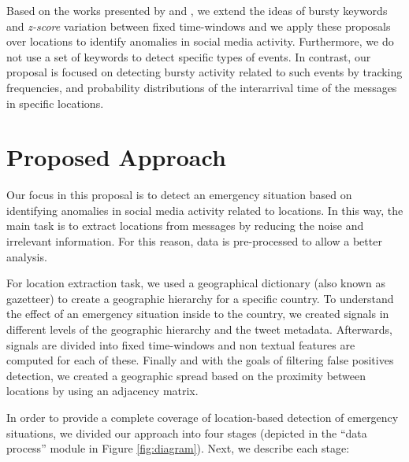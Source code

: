 \documentclass[sigconf]{acmart}
\begin{document}
Based on the works presented by \citeauthor{guzman2013line} \cite{guzman2013line} and \citeauthor{maldonado2017} \cite{maldonado2017}, we extend the ideas of bursty keywords and \textit{z-score} variation between fixed time-windows and we apply these proposals over locations to identify anomalies in social media activity. Furthermore, we do not use a set of keywords to detect specific types of events. In contrast, our proposal is focused on detecting bursty activity related to such events by tracking frequencies, and probability distributions of the interarrival time of the messages in specific locations.



\section{Proposed Approach}

Our focus in this proposal is to detect an emergency situation based on identifying anomalies in social media activity related to locations. In this way, the main task is to extract locations from messages by reducing the noise and irrelevant information. For this reason, data is pre-processed to allow a better analysis.

For location extraction task, we used a geographical dictionary (also known as gazetteer) to create a geographic hierarchy for a specific country. To understand the effect of an emergency situation inside to the country, we created signals in different levels of the geographic hierarchy and the tweet metadata. Afterwards, signals are divided into fixed time-windows and non textual features are computed for each of these. Finally and with the goals of filtering false positives detection, we created a geographic spread based on the proximity between locations by using an adjacency matrix.


In order to provide a complete coverage of location-based detection of emergency situations, we divided our approach into four stages (depicted in the ``data process'' module in Figure \ref{fig:diagram}). Next, we describe each stage:
\end{document}
